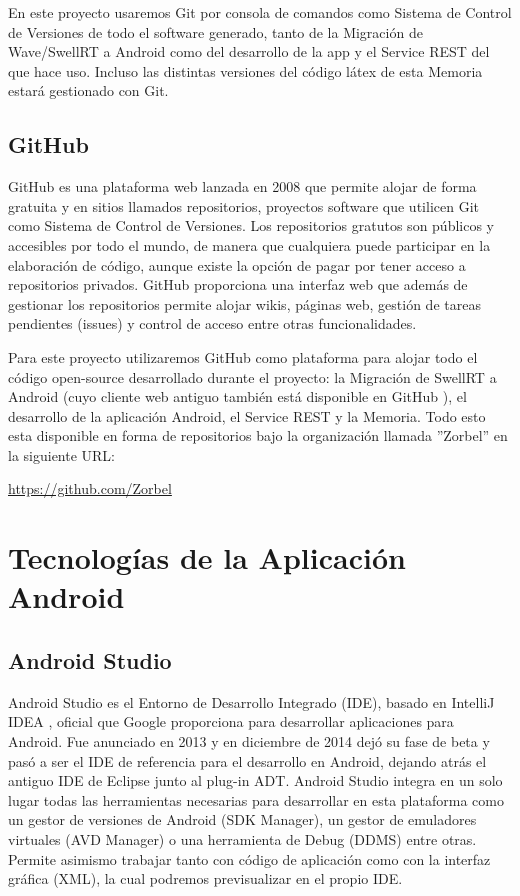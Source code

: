	En este proyecto usaremos Git por consola de comandos como Sistema de Control de Versiones de todo el software generado, tanto de la Migración de Wave/SwellRT a Android como del desarrollo de la app y el Service REST del que hace uso. Incluso las distintas versiones del código látex de esta Memoria estará gestionado con Git.
     
    \subsection{GitHub}\label{ssec:github}
    
    GitHub \cite{ref:github} es una plataforma web lanzada en 2008 que permite alojar de forma gratuita y en sitios llamados repositorios, proyectos software que utilicen Git como Sistema de Control de Versiones. Los repositorios gratutos son públicos y accesibles por todo el mundo, de manera que cualquiera puede participar en la elaboración de código, aunque existe la opción de pagar por tener acceso a repositorios privados. GitHub proporciona una interfaz web que además de gestionar los repositorios permite alojar wikis, páginas web, gestión de tareas pendientes (issues) y control de acceso entre otras funcionalidades.
    
    Para este proyecto utilizaremos GitHub como plataforma para alojar todo el código open-source desarrollado durante el proyecto: la Migración de SwellRT a Android (cuyo cliente web antiguo también está disponible en GitHub \cite{ref:swellRT_github}), el desarrollo de la aplicación Android, el Service REST y la Memoria. Todo esto esta disponible en forma de repositorios bajo la organización llamada ''Zorbel'' en la siguiente URL:
    
    \url{https://github.com/Zorbel}    

\section{Tecnologías de la Aplicación Android}
    
    \subsection{Android Studio}\label{ssec:androidStudio}
    
	Android Studio \cite{ref:android_studio} es el Entorno de Desarrollo Integrado (IDE), basado en IntelliJ IDEA \cite{ref:intelliJ_Idea}, oficial que Google proporciona para desarrollar aplicaciones para Android. Fue anunciado en 2013 y en diciembre de 2014 dejó su fase de beta y pasó a ser el IDE de referencia para el desarrollo en Android, dejando atrás el antiguo IDE de Eclipse junto al plug-in ADT. Android Studio integra en un solo lugar todas las herramientas necesarias para desarrollar en esta plataforma como un gestor de versiones de Android (SDK Manager), un gestor de emuladores virtuales (AVD Manager) o una herramienta de Debug (DDMS) entre otras. Permite asimismo trabajar tanto con código de aplicación como con la interfaz gráfica (XML), la cual podremos previsualizar en el propio IDE.
	
